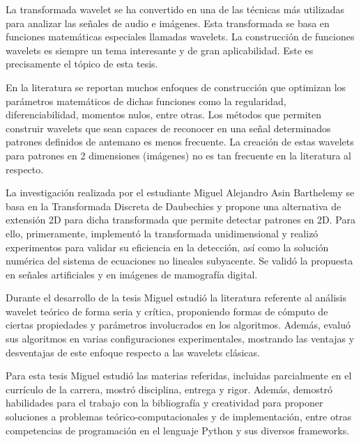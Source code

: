 \begin{opinion}
    \par La transformada wavelet se ha convertido en una de las técnicas más utilizadas para analizar las señales de audio e imágenes. Esta transformada se basa en funciones matemáticas especiales llamadas wavelets. La construcción de funciones wavelets es siempre un tema interesante y de gran aplicabilidad. Este es precisamente el tópico de esta tesis.
    
\par En la literatura se reportan muchos enfoques de construcción que optimizan los parámetros matemáticos de dichas funciones como la regularidad, diferenciabilidad, momentos nulos, entre otras. Los métodos que permiten construir wavelets que sean capaces de reconocer en una señal determinados patrones definidos de antemano es menos frecuente. La creación de estas wavelets para patrones en 2 dimensiones (imágenes) no es tan frecuente en la literatura al respecto.

\par La investigación realizada por el estudiante Miguel Alejandro Asin Barthelemy se basa en la Transformada Discreta de Daubechies y propone una alternativa de extensión 2D para dicha transformada que permite detectar patrones en 2D. Para ello, primeramente, implementó la transformada unidimensional y realizó experimentos para validar su eficiencia en la detección, así como la solución numérica del sistema de ecuaciones no lineales subyacente. Se validó la propuesta en señales artificiales y en imágenes de mamografía digital. 

\par Durante el desarrollo de la tesis Miguel estudió la literatura referente al análisis wavelet teórico de forma seria y crítica, proponiendo formas de cómputo de ciertas propiedades y parámetros involucrados en los algoritmos. Además, evaluó sus algoritmos en varias configuraciones experimentales, mostrando las ventajas y desventajas de este enfoque respecto a las wavelets clásicas. 

\par Para esta tesis Miguel estudió las materias referidas, incluidas parcialmente en el currículo de la carrera, mostró disciplina, entrega y rigor. Además, demostró habilidades para el trabajo con la bibliografía y creatividad para proponer soluciones a problemas teórico-computacionales y de implementación, entre otras competencias de programación en el lenguaje Python y sus diversos frameworks. 


\end{opinion}
